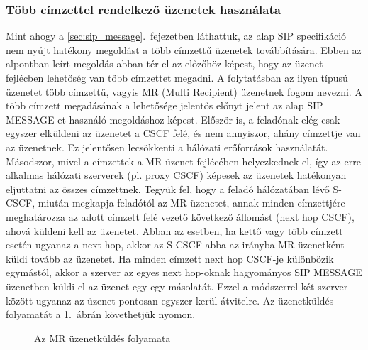 \subsubsection{Több címzettel rendelkező üzenetek használata}
Mint ahogy a \ref{sec:sip_message}.~fejezetben láthattuk, az alap SIP specifikáció nem nyújt hatékony megoldást a több címzettű üzenetek továbbítására. Ebben az alpontban leírt megoldás abban tér el az előzőhöz képest, hogy az üzenet fejlécben lehetőség van több címzettet megadni. A folytatásban az ilyen típusú üzenetet több címzettű, vagyis MR (Multi Recipient) üzenetnek fogom nevezni. A több címzett megadásának a lehetősége jelentős előnyt jelent az alap SIP MESSAGE-et használó megoldáshoz képest. Először is, a feladónak elég csak egyszer elküldeni az üzenetet a CSCF felé, és nem annyiszor, ahány címzettje van az üzenetnek. Ez jelentősen lecsökkenti a hálózati erőforrások használatát. Másodszor, mivel a címzettek a MR üzenet fejlécében helyezkednek el, így az erre alkalmas hálózati szerverek (pl. proxy CSCF) képesek az üzenetek hatékonyan eljuttatni az összes címzettnek. Tegyük fel, hogy a feladó hálózatában lévő S-CSCF, miután megkapja feladótól az MR üzenetet, annak minden címzettjére meghatározza az adott címzett felé vezető következő állomást (next hop CSCF), ahová küldeni kell az üzenetet. Abban az esetben, ha kettő vagy több címzett esetén ugyanaz a next hop, akkor az S-CSCF abba az irányba MR üzenetként küldi tovább az üzenetet. Ha minden címzett next hop CSCF-je különbözik egymástól, akkor a szerver az egyes next hop-oknak hagyományos SIP MESSAGE üzenetben küldi el az üzenet egy-egy másolatát. Ezzel a módszerrel két szerver között ugyanaz az üzenet pontosan egyszer kerül átvitelre. Az üzenetküldés folyamatát a \ref{fig:mrflow}.~ábrán követhetjük nyomon.
\begin{figure}[htbp]
\center
{}
\caption{Az MR üzenetküldés folyamata}
\label{fig:mrflow}
\end{figure}

